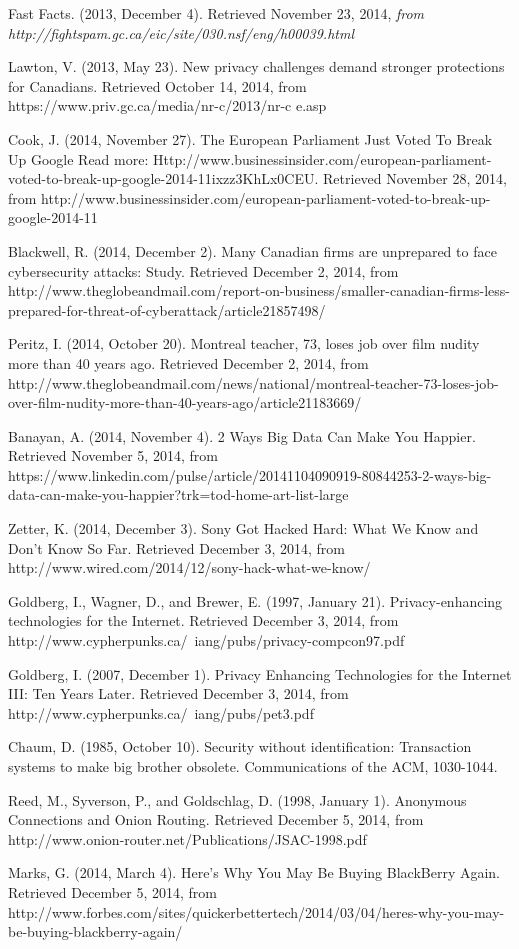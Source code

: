 \documentclass[12pt]{article}
\begin{document}
\begin{thebibliography}{99}
	Fast Facts. (2013, December 4). Retrieved November 23, 2014, {\sl from http://fightspam.gc.ca/eic/site/030.nsf/eng/h\textunderscore00039.html}

	Lawton, V. (2013, May 23). New privacy challenges demand stronger protections for Canadians. Retrieved October 14, 2014, from https://www.priv.gc.ca/media/nr-c/2013/nr-c \textunderscore e.asp

	Cook, J. (2014, November 27). The European Parliament Just Voted To Break Up Google Read more: Http://www.businessinsider.com/european-parliament-voted-to-break-up-google-2014-11ixzz3KhLx0CEU. Retrieved November 28, 2014, from http://www.businessinsider.com/european-parliament-voted-to-break-up-google-2014-11

	Blackwell, R. (2014, December 2). Many Canadian firms are unprepared to face cybersecurity attacks: Study. Retrieved December 2, 2014, from http://www.theglobeandmail.com/report-on-business/smaller-canadian-firms-less-prepared-for-threat-of-cyberattack/article21857498/

	Peritz, I. (2014, October 20). Montreal teacher, 73, loses job over film nudity more than 40 years ago. Retrieved December 2, 2014, from http://www.theglobeandmail.com/news/national/montreal-teacher-73-loses-job-over-film-nudity-more-than-40-years-ago/article21183669/

	Banayan, A. (2014, November 4). 2 Ways Big Data Can Make You Happier. Retrieved November 5, 2014, from https://www.linkedin.com/pulse/article/20141104090919-80844253-2-ways-big-data-can-make-you-happier?trk=tod-home-art-list-large

	Zetter, K. (2014, December 3). Sony Got Hacked Hard: What We Know and Don’t Know So Far. Retrieved December 3, 2014, from http://www.wired.com/2014/12/sony-hack-what-we-know/

	Goldberg, I., Wagner, D., and Brewer, E. (1997, January 21). Privacy-enhancing technologies for the Internet. Retrieved December 3, 2014, from http://www.cypherpunks.ca/~iang/pubs/privacy-compcon97.pdf

	Goldberg, I. (2007, December 1). Privacy Enhancing Technologies for the Internet III: Ten Years Later. Retrieved December 3, 2014, from http://www.cypherpunks.ca/~iang/pubs/pet3.pdf

	Chaum, D. (1985, October 10). Security without identification: Transaction systems to make big brother obsolete. Communications of the ACM, 1030-1044.

	Reed, M., Syverson, P., and Goldschlag, D. (1998, January 1). Anonymous Connections and Onion Routing. Retrieved December 5, 2014, from http://www.onion-router.net/Publications/JSAC-1998.pdf

	Marks, G. (2014, March 4). Here's Why You May Be Buying BlackBerry Again. Retrieved December 5, 2014, from http://www.forbes.com/sites/quickerbettertech/2014/03/04/heres-why-you-may-be-buying-blackberry-again/
\end{thebibliography}
\end{document}
